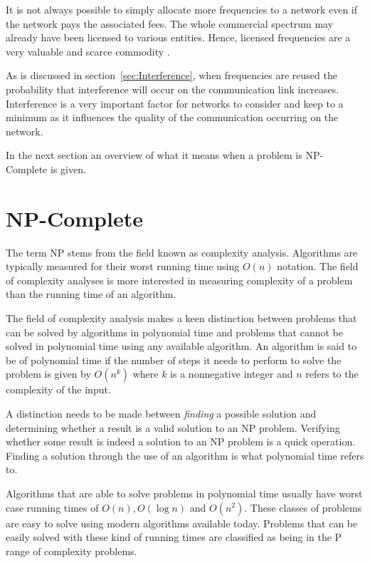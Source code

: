 It is not always possible to simply allocate more frequencies to a network even if the network pays the associated fees. The whole commercial spectrum may already have been licensed to various entities. Hence, licensed frequencies are a very valuable and scarce commodity \cite{FAPRAMColouring,FAPInCell}.

As is discussed in section~\ref{sec:Interference}, when frequencies are reused the probability that interference will occur on the communication link increases. Interference is a very important factor for networks to consider and keep to a minimum as it influences the quality of the communication occurring on the network.

In the next section an overview of what it means when a problem is NP-Complete is given.

\section{NP-Complete}
\label{sec:NPComplete}
The term NP stems from the field known as complexity analysis. Algorithms are typically measured for their worst running time using $O(n)$ notation. The field of complexity analyses is more interested in measuring complexity of a problem than the running time of an algorithm\cite{AIModernApproach}.

The field of complexity analysis makes a keen distinction between problems that can be solved by algorithms in polynomial time and problems that cannot be solved in polynomial time using any available algorithm\cite{AIModernApproach}. An algorithm is said to be of polynomial time if the number of steps it needs to perform to solve the problem is given by $O(n^k)$ where $k$ is a nonnegative integer and $n$ refers to the complexity of the input\cite{AIModernApproach}.

A distinction needs to be made between \emph{finding} a possible solution and determining whether a result is a valid solution to an NP problem\cite{AIModernApproach}. Verifying whether some result is indeed a solution to an NP problem is a quick operation\cite{AIModernApproach}. Finding a solution through the use of an algorithm is what polynomial time refers to.

Algorithms that are able to solve problems in polynomial time usually have worst case running times of $O(n),O(\log n)$ and $O(n^2)$\cite{AIModernApproach}. These classes of problems are easy to solve using modern algorithms available today. Problems that can be easily solved with these kind of running times are classified as being in the P range of complexity problems\cite{AIModernApproach}.

